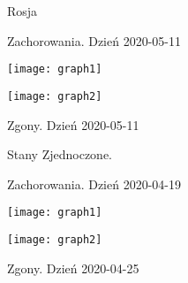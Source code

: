 \documentclass[12pt]{article}
\begin{document}
\begin{figure}[hbt!]
\centering Rosja
 \centering
 \caption{Zachorowania. Dzień 2020-05-11}
 \texttt{[image: graph1]}
 \caption{Zgony. Dzień 2020-05-11} 
 \texttt{[image: graph2]}
 \begin{flushleft}
 \end{flushleft} 
\end{figure}

\begin{figure}[hbt!]
\centering Stany Zjednoczone. 
 \centering
 \caption{Zachorowania. Dzień 2020-04-19}
 \texttt{[image: graph1]}
 \caption{Zgony. Dzień 2020-04-25} 
 \texttt{[image: graph2]}
 \begin{flushleft}
 \end{flushleft} 
\end{figure}
\end{document}
